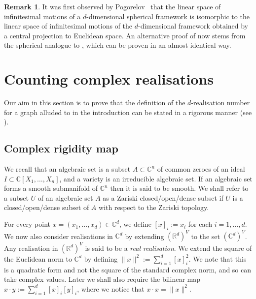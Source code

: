 \documentclass[11pt]{article}
\theoremstyle{definition}
\newtheorem{remark}[theo]{Remark}
\numberwithin{equation}{section}
\begin{document}
\begin{remark}
	It was first observed by Pogorelov~\cite[Chapter V]{Pog73} that the linear space of infinitesimal motions of a $d$-dimensional spherical framework is isomorphic to the linear space of infinitesimal motions of the $d$-dimensional framework obtained by a central projection to Euclidean space.
	An alternative proof of  now stems from the spherical analogue to ,
	which can be proven in an almost identical way.
\end{remark}


\section{Counting complex realisations}\label{sec:count}

Our aim in this section is to prove that the definition of the $d$-realisation number for a graph alluded to in the introduction can be stated in a rigorous manner (see ).

\subsection{Complex rigidity map}

We recall that an algebraic set is a subset $A \subset \mathbb{C}^n$ of common zeroes of an ideal $I \subset \mathbb{C}[X_1,\ldots,X_n]$,
and a variety is an irreducible algebraic set.
If an algebraic set forms a smooth submanifold of $\mathbb{C}^n$ then it is said to be smooth.
We shall refer to a subset $U$ of an algebraic set $A$ as a Zariski closed/open/dense subset if $U$ is a closed/open/dense subset of $A$ with respect to the Zariski topology.

For every point  $x=(x_1,\ldots,x_d) \in \mathbb{C}^d$,
we define $[x]_i := x_i$ for each $i =1,\ldots,d$.
We now also consider realisations in $\mathbb{C}^d$ by extending $(\mathbb{R}^d)^V$ to the set $(\mathbb{C}^d)^V$.
Any realisation in $(\mathbb{R}^d)^V$ is said to be a \emph{real realisation}.
We extend the square of the Euclidean norm to $\mathbb{C}^d$ by defining $\|x\|^2 := \sum_{i=1}^d [x]_i^2$.
We note that this is a quadratic form and not the square of the standard complex norm,
and so can take complex values.
Later we shall also require the bilinear map $x \cdot y := \sum_{i =1}^d [x]_i [y]_i$,
where we notice that $x \cdot x = \| x\|^2$.
\end{document}
